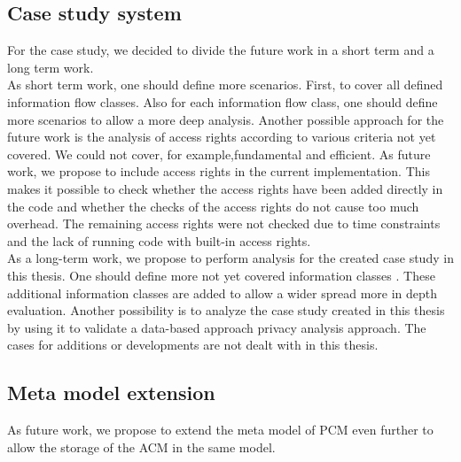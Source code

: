\subsection{Case study system}
For the case study, we decided to divide the future work in a short term and a long term work.\\
As short term work, one should define more scenarios. First, to cover all defined information flow classes. Also for each information flow class, one should define more scenarios to allow a more deep analysis. Another possible approach for the future work is the analysis of access rights according to various criteria not yet covered. We could not cover, for example,fundamental and efficient. As future work, we propose to include access rights in the current implementation. This makes it possible to check whether the access rights have been added directly in the code and whether the checks of the access rights do not cause too much overhead.  The remaining access rights were not checked due to time constraints and the lack of running code with built-in access rights.\\ 
As a long-term work, we propose to perform analysis for the created case study in this thesis. One should define more not yet covered information classes . These additional information classes are added to allow a wider spread more in depth evaluation. Another possibility is to analyze the case study created in this thesis by using it to validate a data-based approach privacy analysis approach. The cases for additions or developments are not dealt with in this thesis.
\subsection{Meta model extension}
As future work, we propose to extend the meta model of PCM even further to allow the storage of the ACM in the same model.
